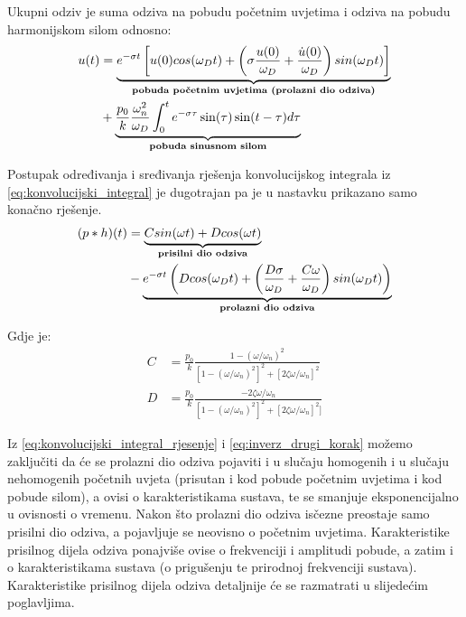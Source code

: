 Ukupni odziv je suma odziva na pobudu početnim uvjetima i odziva na pobudu
harmonijskom silom odnosno:
\begin{equation}
    \begin{split}
    u(t)&=\underbrace{e^{-\sigma t}\left[
		u(0)cos(\omega_Dt)+\left(
                        \sigma\frac{u(0)}{\omega_D}+\frac{\dot{u}(0)}{\omega_D}
                        \right)sin(\omega_Dt) \right]}_{\text{\textbf{pobuda
                    početnim uvjetima (prolazni dio odziva)}}}\\
                    &+\underbrace{
                        \frac{p_0}{k}
                        \frac{\omega_n^2}{\omega_D}
                        \int_0^te^{-\sigma\tau}\sin(\tau)\sin(t-\tau)d\tau
                    }_{\text{\textbf{pobuda sinusnom silom}}}
    \end{split}
    \label{eq:inverz_drugi_korak}
\end{equation}

Postupak određivanja i sređivanja rješenja konvolucijskog integrala iz
\eqref{eq:konvolucijski_integral} je dugotrajan pa je u nastavku prikazano samo konačno 
rješenje.
\begin{equation}
	\begin{split}
	(p*h)(t)&=\underbrace{
			Csin(\omega t)+Dcos(\omega t)
		}_{\text{\textbf{prisilni dio odziva}}}\\
		&-
		\underbrace{
			e^{-\sigma t}
				\left(
				Dcos(\omega_D t) +
					\left(
						\frac{D\sigma}{\omega_D}+\frac{C\omega}{\omega_D}
					\right)
				sin(\omega_Dt)
				\right)
		}_{\text{\textbf{prolazni dio odziva}}}
	\end{split}
    \label{eq:konvolucijski_integral_rjesenje}
\end{equation}

Gdje je:
\begin{align}
    C &= \frac{p_0}{k}\frac{1-(\omega/\omega_n)^2}
            {[1-(\omega/\omega_n)^2]^2+[2\zeta\omega/\omega_n]^2}\label{eq:koef_C}\\
    D &= \frac{p_0}{k}\frac{-2\zeta\omega/\omega_n}
            {[1-(\omega/\omega_n)^2]^2+[2\zeta\omega/\omega_n]^2]}\label{eq:koef_D}
\end{align}

Iz \eqref{eq:konvolucijski_integral_rjesenje} i \eqref{eq:inverz_drugi_korak} možemo
zaključiti da će se prolazni dio odziva pojaviti i u slučaju homogenih i u slučaju
nehomogenih početnih uvjeta (prisutan i kod pobude početnim uvjetima i kod pobude
silom), a ovisi o karakteristikama sustava,
te se smanjuje eksponencijalno u ovisnosti o vremenu. Nakon
što prolazni dio odziva isčezne preostaje samo prisilni dio odziva, a pojavljuje se
neovisno o početnim uvjetima. Karakteristike prisilnog dijela odziva ponajviše ovise
o frekvenciji i amplitudi pobude, a zatim i o karakteristikama sustava (o prigušenju
te prirodnoj frekvenciji sustava). Karakteristike prisilnog dijela odziva detaljnije će se
razmatrati u slijedećim poglavljima.
\par

